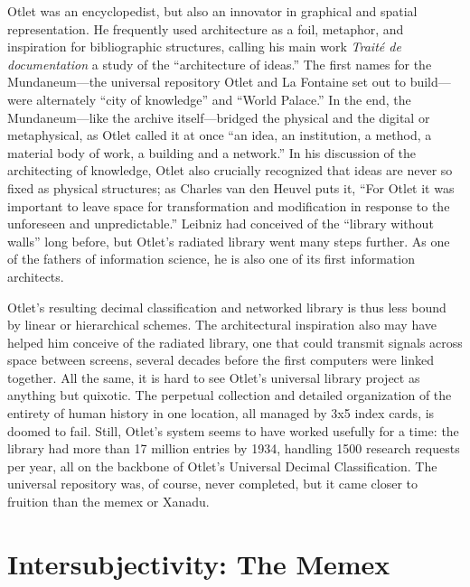 Otlet was an encyclopedist, but also an innovator in graphical and spatial representation. He frequently used architecture as a foil, metaphor, and inspiration for bibliographic structures, calling his main work \emph{Trait\'{e} de documentation} a study of the ``architecture of ideas.''\autocite[129]{van_de_heuvel_building_2008} The first names for the Mundaneum---the universal repository Otlet and La Fontaine set out to build---were alternately ``city of knowledge'' and ``World Palace.'' In the end, the Mundaneum---like the archive itself---bridged the physical and the digital or metaphysical, as Otlet called it at once ``an idea, an institution, a method, a material body of work, a building and a network.''\autocite[130]{van_de_heuvel_building_2008} In his discussion of the architecting of knowledge, Otlet also crucially recognized that ideas are never so fixed as physical structures; as Charles van den Heuvel puts it, ``For Otlet it was important to leave space for transformation and modification in response to the unforeseen and unpredictable.''\autocite[131]{van_de_heuvel_building_2008} Leibniz had conceived of the ``library without walls'' long before, but Otlet's radiated library went many steps further. As one of the fathers of information science, he is also one of its first information architects.

Otlet's resulting decimal classification and networked library is thus less bound by linear or hierarchical schemes. The architectural inspiration also may have helped him conceive of the radiated library, one that could transmit signals across space between screens, several decades before the first computers were linked together. All the same, it is hard to see Otlet's universal library project as anything but quixotic. The perpetual collection and detailed organization of the entirety of human history in one location, all managed by 3x5 index cards, is doomed to fail. Still, Otlet's system seems to have worked usefully for a time: the library had more than 17 million entries by 1934, handling 1500 research requests per year, all on the backbone of Otlet's Universal Decimal Classification.\autocite{_limited_2001} The universal repository was, of course, never completed, but it came closer to fruition than the memex or Xanadu.


\section{Intersubjectivity: The Memex}

